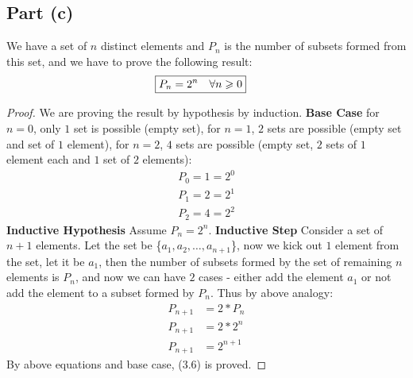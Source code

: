 \documentclass{article}
\begin{document}
{  \subsection{Part (c)}{
    We have a set of $n$ distinct elements and $P_n$ is the number of subsets formed from this set, and we have to prove the following result:
    \begin{align}
      \Aboxed{P_n=2^n \quad \forall n \geqslant 0} \label{eq:6}
    \end{align}
    \begin{proof}
      We are proving the result by hypothesis by induction. \newline
      \textbf{Base Case} for $n=0$, only $1$ set is possible (empty set), for $n=1$, $2$ sets are possible (empty set and set of $1$ element), for $n=2$, $4$ sets are possible (empty set, $2$ sets of $1$ element each and $1$ set of $2$ elements):
      \begin{align*}
        P_0=1=2^0 \\
        P_1=2=2^1 \\
        P_2=4=2^2
      \end{align*}
      \textbf{Inductive Hypothesis} Assume $P_n=2^n$. \newline
      \textbf{Inductive Step} Consider a set of $n+1$ elements. \newline
      Let the set be \{$a_1,a_2,\dots,a_{n+1}$\}, now we kick out $1$ element from the set, let it be $a_1$, then the number of subsets formed by the set of remaining $n$ elements is $P_n$, and now we can have $2$ cases - either add the element $a_1$ or not add the element to a subset formed by $P_n$. \newline
      Thus by above analogy:
      \begin{align*}
        P_{n+1}&=2*P_n \\
        P_{n+1}&=2*2^n \\
        P_{n+1}&=2^{n+1}
      \end{align*}
      By above equations and base case, (3.6) is proved.
    \end{proof}
  }
}
\end{document}
